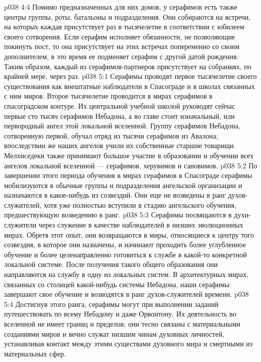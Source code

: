 \vs p038 4:4 Помимо предназначенных для них домов, у серафимов есть также центры группы, роты, батальоны и подразделения. Они собираются на встречи, на которых каждая присутствует раз в тысячелетие в соответствии с юбилеем своего сотворения. Если серафим исполняет обязанности, не позволяющие покинуть пост, то она присутствует на этих встречах попеременно со своим дополнителем, в это время ее подменяет серафим с другой датой рождения. Таким образом, каждый из серафимов\hyp{}партнеров присутствует на собраниях, по крайней мере, через раз.
\vs p038 5:1 Серафимы проводят первое тысячелетие своего существования как внештатные наблюдатели в Спасограде и в школах связанных с ним миров. Второе тысячелетие проводится в мирах серафимов в спасоградском контуре. Их центральной учебной школой руководят сейчас первые сто тысяч серафимов Небадона, а во главе стоит изначальный, или первородный ангел этой локальной вселенной. Группу серафимов Небадона, сотворенную первой, обучал отряд из тысячи серафимов из Авалона; впоследствии же наших ангелов учили их собственные старшие товарищи. Мелхиседеки также принимают большое участие в образовании и обучении всех ангелов локальной вселенной --- серафимов, херувимов и сановимов.
\vs p038 5:2 По завершении этого периода обучения в мирах серафимов в Спасограде серафимы мобилизуются в обычные группы и подразделения ангельской организации и назначаются в какое\hyp{}нибудь из созвездий. Они еще не возведены в ранг духов\hyp{}служителей, хотя уже полностью вступили в стадию ангельского обучения, предшествующую возведению в ранг.
\vs p038 5:3 Серафимы посвящаются в духи\hyp{}служители через служение в качестве наблюдателей в низших эволюционных мирах. Обретя этот опыт, они возвращаются в миры, относящиеся к центру того созвездия, в которое они назначены, и начинают проходить более углубленное обучение и более целенаправленно готовиться к службе в какой\hyp{}то конкретной локальной системе. После получения такого общего образования они направляются на службу в одну из локальных систем. В архитектурных мирах, связанных со столицей какой\hyp{}нибудь системы Небадона, наши серафимы завершают свое обучение и возводятся в ранг духов\hyp{}служителей времени.
\vs p038 5:4 Достигнув этого ранга, серафимы могут при выполнении заданий путешествовать по всему Небадону и даже Орвонтону. Их деятельность во вселенной не имеет границ и пределов; они тесно связаны с материальными созданиями миров и вечно служат низшим чинам духовных личностей, устанавливая контакт между этими существами духовного мира и смертными из материальных сфер.
